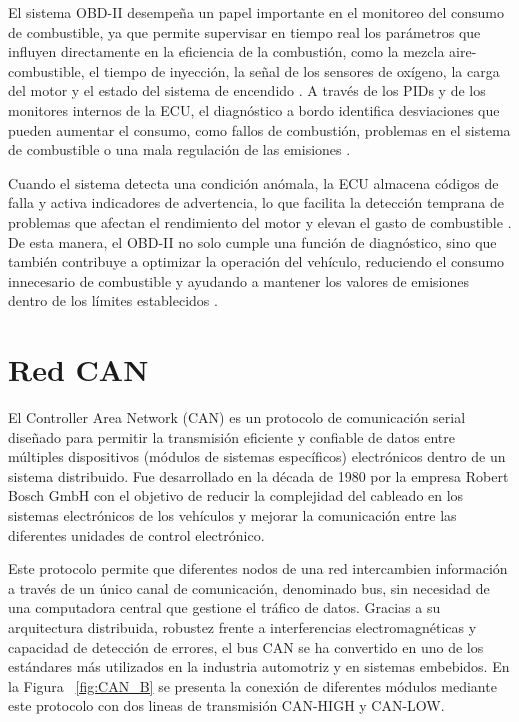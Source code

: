 El sistema OBD-II desempeña un papel importante en el monitoreo del consumo de combustible, ya que permite supervisar en tiempo real los parámetros que influyen directamente en la eficiencia de la combustión, como la mezcla aire-combustible, el tiempo de inyección, la señal de los sensores de oxígeno, la carga del motor y el estado del sistema de encendido \citep{MotoresUno_OBD2, Webfleet_OBD}. A través de los PIDs y de los monitores internos de la ECU, el diagnóstico a bordo identifica desviaciones que pueden aumentar el consumo, como fallos de combustión, problemas en el sistema de combustible o una mala regulación de las emisiones \citep{MotoresUno_OBD2}.

Cuando el sistema detecta una condición anómala, la ECU almacena códigos de falla y activa indicadores de advertencia, lo que facilita la detección temprana de problemas que afectan el rendimiento del motor y elevan el gasto de combustible \citep{Rodi_OBD2}. De esta manera, el OBD-II no solo cumple una función de diagnóstico, sino que también contribuye a optimizar la operación del vehículo, reduciendo el consumo innecesario de combustible y ayudando a mantener los valores de emisiones dentro de los límites establecidos \citep{Webfleet_OBD, Autoavance_ManualOBDII}.
\section{Red CAN}

El Controller Area Network (CAN) es un protocolo de comunicación serial diseñado para permitir la transmisión eficiente y confiable de datos entre múltiples dispositivos (módulos de sistemas específicos) electrónicos dentro de un sistema distribuido. Fue desarrollado en la década de 1980 por la empresa Robert Bosch GmbH con el objetivo de reducir la complejidad del cableado en los sistemas electrónicos de los vehículos y mejorar la comunicación entre las diferentes unidades de control electrónico.


Este protocolo permite que diferentes nodos de una red intercambien información a través de un único canal de comunicación, denominado bus, sin necesidad de una computadora central que gestione el tráfico de datos. Gracias a su arquitectura distribuida, robustez frente a interferencias electromagnéticas y capacidad de detección de errores, el bus CAN se ha convertido en uno de los estándares más utilizados en la industria automotriz y en sistemas embebidos. En la Figura ~\ref{fig:CAN_B} se presenta la conexión de diferentes módulos mediante este protocolo con dos lineas de transmisión CAN-HIGH y CAN-LOW.

